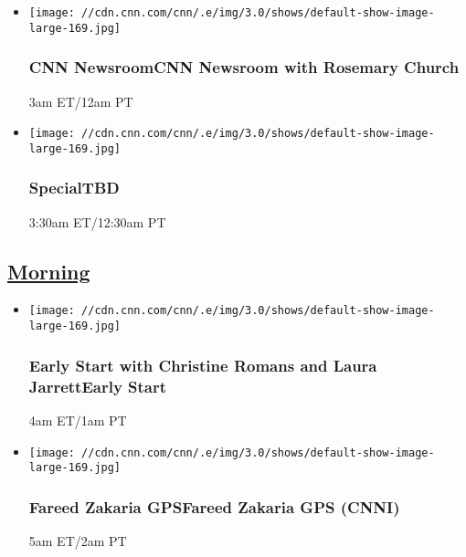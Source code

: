 \begin{itemize}
\item
  \texttt{[image: //cdn.cnn.com/cnn/.e/img/3.0/shows/default-show-image-large-169.jpg]}

  \hypertarget{cnn-newsroomcnn-newsroom-with-rosemary-church--1}{%
  \subsubsection{CNN NewsroomCNN Newsroom with Rosemary Church
  }\label{cnn-newsroomcnn-newsroom-with-rosemary-church--1}}

  3am ET/12am PT
\end{itemize}

\begin{itemize}
\item
  \texttt{[image: //cdn.cnn.com/cnn/.e/img/3.0/shows/default-show-image-large-169.jpg]}

  \hypertarget{specialtbd--5}{%
  \subsubsection{SpecialTBD }\label{specialtbd--5}}

  3:30am ET/12:30am PT
\end{itemize}

\hypertarget{morning--2}{%
\subsection{\texorpdfstring{\href{/tv/schedule/cnn/index.html}{Morning}~}{Morning~}}\label{morning--2}}

\begin{itemize}
\item
  \texttt{[image: //cdn.cnn.com/cnn/.e/img/3.0/shows/default-show-image-large-169.jpg]}

  \hypertarget{early-start-with-christine-romans-and-laura-jarrettearly-start-}{%
  \subsubsection{Early Start with Christine Romans and Laura
  JarrettEarly Start
  }\label{early-start-with-christine-romans-and-laura-jarrettearly-start-}}

  4am ET/1am PT
\end{itemize}

\begin{itemize}
\item
  \texttt{[image: //cdn.cnn.com/cnn/.e/img/3.0/shows/default-show-image-large-169.jpg]}

  \hypertarget{fareed-zakaria-gpsfareed-zakaria-gps-cnni--4}{%
  \subsubsection{Fareed Zakaria GPSFareed Zakaria GPS (CNNI)
  }\label{fareed-zakaria-gpsfareed-zakaria-gps-cnni--4}}

  5am ET/2am PT
\end{itemize}


